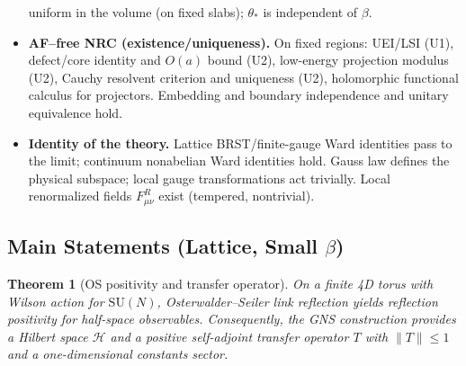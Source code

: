 \documentclass[11pt]{amsart}
\theoremstyle{plain}
\newtheorem{theorem}{Theorem}[section]
\theoremstyle{definition}
\theoremstyle{remark}
\begin{document}
\begin{itemize}[leftmargin=2em, itemsep=8pt, parsep=4pt]
  uniform in the volume (on fixed slabs); $\theta_*$ is independent of $\beta$.
  \item \textbf{AF–free NRC (existence/uniqueness).} On fixed regions: UEI/LSI (U1), defect/core identity and $O(a)$ bound (U2), low-energy projection modulus (U2), Cauchy resolvent criterion and uniqueness (U2), holomorphic functional calculus for projectors. Embedding and boundary independence and unitary equivalence hold.
  \item \textbf{Identity of the theory.} Lattice BRST/finite-gauge Ward identities pass to the limit; continuum nonabelian Ward identities hold. Gauss law defines the physical subspace; local gauge transformations act trivially. Local renormalized fields $F_{\mu\nu}^R$ exist (tempered, nontrivial).
\end{itemize}
\subsection{Main Statements (Lattice, Small $\beta$)}
\vspace{6pt}
\begin{theorem}[OS positivity and transfer operator] \label{thm:os}
On a finite 4D torus with Wilson action for $\mathrm{SU}(N)$, Osterwalder--Seiler link reflection yields reflection positivity for half-space observables. Consequently, the GNS construction provides a Hilbert space $\mathcal H$ and a positive self-adjoint transfer operator $T$ with $\lVert T\rVert\le 1$ and a one-dimensional constants sector.
\end{theorem}
\end{document}
